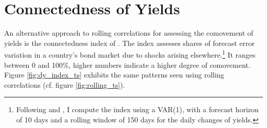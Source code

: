 


\renewcommand\thefigure{\thesection.\arabic{figure}}
\section{Connectedness of Yields} \label{sec:dyindex}
\setcounter{figure}{0}


An alternative approach to rolling correlations for assessing the comovement of yields is the connectedness index of \cite{DieboldYilmaz:2014}. 
The index assesses shares of forecast error variation in a country's bond market due to shocks arising elsewhere.\footnote{ Following \cite{ACDM:2019} and \cite{BostanciYilmaz:2020}, I compute the index  using a VAR(1), with a forecast horizon of 10 days and a rolling window of 150 days for the daily changes of yields.} 
It ranges between 0 and 100\%, higher numbers indicate a higher degree of comovement. 
Figure \ref{fig:dy_index_ts} exhibits the same patterns seen using rolling correlations (cf. figure \ref{fig:rolling_ts}).

